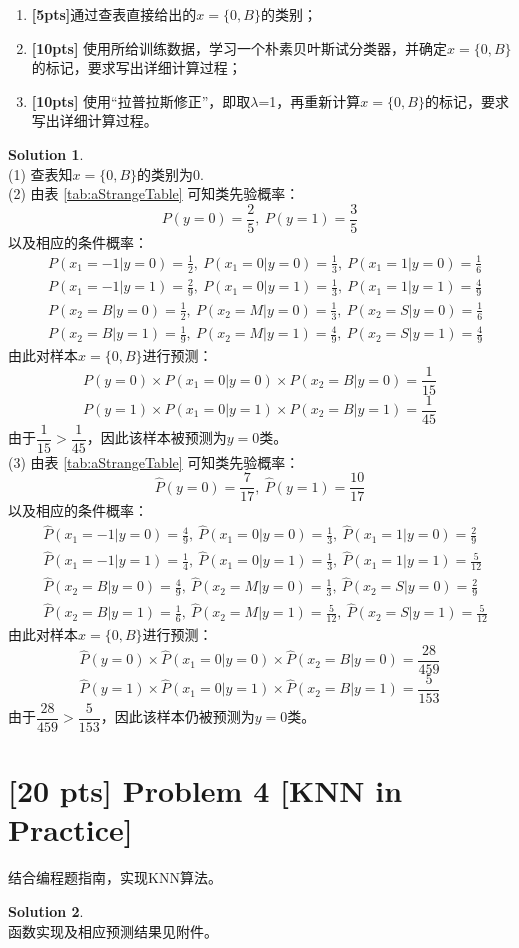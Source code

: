 \documentclass[a4paper,UTF8]{article}
\theoremstyle{definition}
\newtheorem*{solution}{Solution}
\begin{document}
	\begin{enumerate}[(1)]
	    \item \textbf{[5pts]}通过查表直接给出的$x=\{0,B\}$的类别；
		\item \textbf{[10pts]} 使用所给训练数据，学习一个朴素贝叶斯试分类器，并确定$x=\{0,B\}$的标记，要求写出详细计算过程；
		\item \textbf{[10pts]} 使用“拉普拉斯修正”，即取$\lambda$=1，再重新计算$x=\{0,B\}$的标记，要求写出详细计算过程。
	\end{enumerate}
\begin{solution}
~\\(1) 查表知$x=\{0,B\}$的类别为$0$.
 \\(2) 由表 \ref{tab:aStrangeTable} 可知类先验概率：$$P(y=0)=\frac{2}{5},\ P(y=1)=\frac{3}{5}$$
以及相应的条件概率：\begin{equation}\nonumber
\begin{aligned}
&P(x_1=-1|y=0)=\frac{1}{2},\ P(x_1=0|y=0)=\frac{1}{3},\ P(x_1=1|y=0)=\frac{1}{6}\\
&P(x_1=-1|y=1)=\frac{2}{9},\ P(x_1=0|y=1)=\frac{1}{3},\ P(x_1=1|y=1)=\frac{4}{9}\\
&P(x_2=B|y=0)=\frac{1}{2},\ P(x_2=M|y=0)=\frac{1}{3},\ P(x_2=S|y=0)=\frac{1}{6}\\
&P(x_2=B|y=1)=\frac{1}{9},\ P(x_2=M|y=1)=\frac{4}{9},\ P(x_2=S|y=1)=\frac{4}{9}
\end{aligned}
\end{equation}
由此对样本$x=\{0,B\}$进行预测：
$$P(y=0)\times P(x_1=0|y=0)\times P(x_2=B|y=0)=\frac{1}{15}$$$$P(y=1)\times P(x_1=0|y=1)\times P(x_2=B|y=1)=\frac{1}{45}$$
由于$\dfrac{1}{15}>\dfrac{1}{45}$，因此该样本被预测为$y=0$类。\\[6pt]
 (3) 由表 \ref{tab:aStrangeTable} 可知类先验概率：$$\hat{P}(y=0)=\frac{7}{17},\ \hat{P}(y=1)=\frac{10}{17}$$
以及相应的条件概率：\begin{equation}\nonumber
\begin{aligned}
&\hat{P}(x_1=-1|y=0)=\frac{4}{9},\ \hat{P}(x_1=0|y=0)=\frac{1}{3},\ \hat{P}(x_1=1|y=0)=\frac{2}{9}\\
&\hat{P}(x_1=-1|y=1)=\frac{1}{4},\ \hat{P}(x_1=0|y=1)=\frac{1}{3},\ \hat{P}(x_1=1|y=1)=\frac{5}{12}\\
&\hat{P}(x_2=B|y=0)=\frac{4}{9},\ \hat{P}(x_2=M|y=0)=\frac{1}{3},\ \hat{P}(x_2=S|y=0)=\frac{2}{9}\\
&\hat{P}(x_2=B|y=1)=\frac{1}{6},\ \hat{P}(x_2=M|y=1)=\frac{5}{12},\ \hat{P}(x_2=S|y=1)=\frac{5}{12}
\end{aligned}
\end{equation}
由此对样本$x=\{0,B\}$进行预测：
$$\hat{P}(y=0)\times \hat{P}(x_1=0|y=0)\times \hat{P}(x_2=B|y=0)=\frac{28}{459}$$$$\hat{P}(y=1)\times \hat{P}(x_1=0|y=1)\times \hat{P}(x_2=B|y=1)=\frac{5}{153}$$
由于$\dfrac{28}{459}>\dfrac{5}{153}$，因此该样本仍被预测为$y=0$类。
\end{solution}

\section*{[20 pts] Problem 4 [KNN in Practice]}
\par 
	结合编程题指南，实现KNN算法。

\begin{solution}
~\\函数实现及相应预测结果见附件。
\end{solution}



\end{document}
